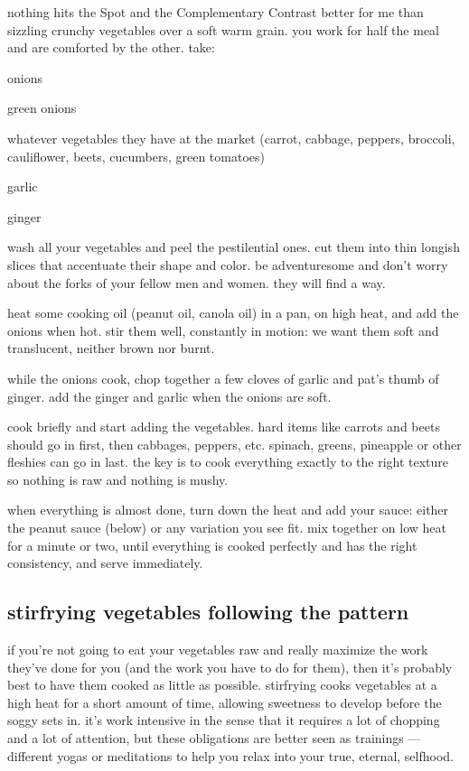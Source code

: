 nothing hits the Spot and the Complementary Contrast better for me than 
sizzling crunchy vegetables over a soft warm grain. you work for half the 
meal and are comforted by the other. take:

\begin{ingredients}
  \item onions
  \item green onions
  \item whatever vegetables they have at the market (carrot, cabbage, peppers, 
  broccoli, cauliflower, beets, cucumbers, green tomatoes)
  \item garlic
  \item ginger
\end{ingredients}
wash all your vegetables and peel the pestilential ones. cut them into thin longish slices that accentuate their shape and color. be adventuresome and don't worry about the forks of your fellow men and women. they will find a way.

heat some cooking oil (peanut oil, canola oil) in a pan, on high heat, and 
add the onions when hot. stir them well, constantly in motion: we want them 
soft and translucent, neither brown nor burnt.

while the onions cook, chop together a few cloves of garlic and pat's thumb 
of ginger. add the ginger and garlic when the onions are soft.

cook briefly and start adding the vegetables. hard items like carrots and 
beets should go in first, then cabbages, peppers, etc. spinach, greens, 
pineapple or other fleshies can go in last. the key is to cook everything 
exactly to the right texture so nothing is raw and nothing is mushy.

when everything is almost done, turn down the heat and add your sauce: 
either the peanut sauce (below) or any variation you see fit. mix together 
on low heat for a minute or two, until everything is cooked perfectly and has 
the right consistency, and serve immediately.

\subsection{stirfrying vegetables following the pattern}

if you're not going to eat your vegetables raw and really maximize the work 
they've done for you (and the work you have to do for them), then it's 
probably best to have them cooked as little as possible. stirfrying cooks 
vegetables at a high heat for a short amount of time, allowing sweetness to 
develop before the soggy sets in. it's work intensive in the sense that it 
requires a lot of chopping and a lot of attention, but these obligations are 
better seen as trainings --- different yogas or meditations to help you relax 
into your true, eternal, selfhood.

